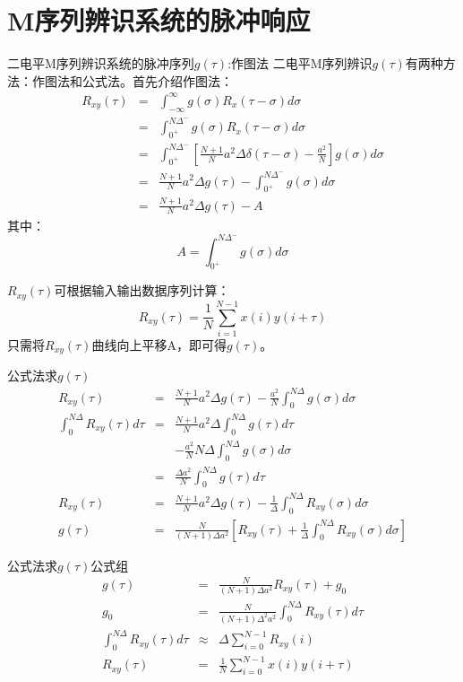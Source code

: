 \section{M序列辨识系统的脉冲响应}

\begin{frame}{二电平M序列辨识系统的脉冲序列$g(\tau)$:作图法}
二电平M序列辨识$g(\tau)$有两种方法：作图法和公式法。首先介绍作图法：
\begin{eqnarray*}
R_{xy}(\tau) &=&  \int_{-\infty}^{\infty}g(\sigma)R_x(\tau-\sigma)d\sigma  \\
&=& \int_{0^+}^{N\Delta^-}g(\sigma)R_x(\tau-\sigma)d\sigma \\
&=& \int_{0^+}^{N\Delta^-}\left[\frac{N+1}{N}a^2\Delta\delta(\tau-\sigma)-\frac{a^2}{N}\right]g(\sigma)d\sigma \\
&=& \frac{N+1}{N}a^2\Delta g(\tau)-\int_{0^+}^{N\Delta^-}g(\sigma)d\sigma \\
&=& \frac{N+1}{N}a^2\Delta g(\tau)-A 
\end{eqnarray*}
其中：
$$
A=\int_{0^+}^{N\Delta^-}g(\sigma)d\sigma 
$$
\end{frame}

\begin{frame}
$R_{xy}(\tau)$可根据输入输出数据序列计算：
$$
R_{xy}(\tau)=\frac{1}{N}\sum_{i=1}^{N-1}x(i)y(i+\tau)
$$
只需将$R_{xy}(\tau)$曲线向上平移A，即可得$g(\tau)$。
\end{frame}

\begin{frame}{公式法求$g(\tau)$}
\begin{eqnarray*}
R_{xy}(\tau) &=& \frac{N+1}{N}a^2\Delta g(\tau)-\frac{a^2}{N}\int_0^{N\Delta}g(\sigma)d\sigma \\
\int_0^{N\Delta}R_{xy}(\tau)d\tau &=& \frac{N+1}{N}a^2\Delta \int_0^{N\Delta}g(\tau)d\tau \\
&& -\frac{a^2}{N}N\Delta\int_0^{N\Delta}g(\sigma)d\sigma \\
&=&\frac{\Delta a^2}{N}\int_0^{N\Delta}g(\tau)d\tau  \\
R_{xy}(\tau) &=& \frac{N+1}{N}a^2\Delta g(\tau)-\frac{1}{\Delta}\int_0^{N\Delta}R_{xy}(\sigma)d\sigma \\
g(\tau)&=&\frac{N}{(N+1)\Delta a^2}\left[R_{xy}(\tau)+\frac{1}{\Delta}\int_0^{N\Delta}R_{xy}(\sigma)d\sigma\right]
\end{eqnarray*}
\end{frame}

\begin{frame}{公式法求$g(\tau)$公式组}
\begin{eqnarray*}
g(\tau)&=&\frac{N}{(N+1)\Delta a^2}R_{xy}(\tau) +g_0\\
g_0 &=& \frac{N}{(N+1)\Delta^2 a^2}\int_0^{N\Delta}R_{xy}(\tau)d\tau \\
\int_0^{N\Delta}R_{xy}(\tau)d\tau &\approx & \Delta\sum_{i=0}^{N-1}R_{xy}(i) \\
R_{xy}(\tau) &=& \frac{1}{N}\sum_{i=0}^{N-1}x(i)y(i+\tau)
\end{eqnarray*}
\end{frame}

